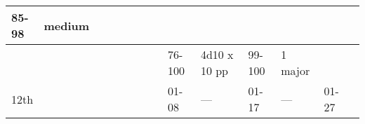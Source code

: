 \begin{longtable}{llllllllllllll}
{\begin{minipage}[t]{0.626in}
85-98\end{minipage}} & \multicolumn{1}{p{0.469in}|}{\begin{minipage}[t]{0.469in}\centering
1 medium\end{minipage}}\\
\hline
\multicolumn{8}{p{1.150in}|}{\begin{minipage}[t]{1.150in}\centering
\end{minipage}} & \multicolumn{1}{|p{0.393in}|}{\begin{minipage}[t]{0.393in}\raggedright
76-100\end{minipage}} & \multicolumn{1}{p{0.469in}|}{\begin{minipage}[t]{0.469in}\raggedright
4d10 x 10 pp\end{minipage}} & \multicolumn{1}{p{0.923in}|}{\begin{minipage}[t]{0.923in}\raggedright
99-100\end{minipage}} & \multicolumn{1}{p{0.469in}|}{\begin{minipage}[t]{0.469in}\raggedright
1 major\end{minipage}} & \multicolumn{1}{p{0.626in}|}{\begin{minipage}[t]{0.626in}\raggedright
\end{minipage}} & \multicolumn{1}{p{0.469in}|}{\begin{minipage}[t]{0.469in}\centering
\end{minipage}}\\
\hline
\multicolumn{8}{p{1.150in}|}{\begin{minipage}[t]{1.150in}\centering
12th\end{minipage}} & \multicolumn{1}{|p{0.393in}|}{\begin{minipage}[t]{0.393in}\raggedright
01-08\end{minipage}} & \multicolumn{1}{p{0.469in}|}{\begin{minipage}[t]{0.469in}\raggedright
---\end{minipage}} & \multicolumn{1}{p{0.923in}|}{\begin{minipage}[t]{0.923in}\raggedright
01-17\end{minipage}} & \multicolumn{1}{p{0.469in}|}{\begin{minipage}[t]{0.469in}\raggedright
---\end{minipage}} & \multicolumn{1}{p{0.626in}|}{\begin{minipage}[t]{0.626in}\raggedright
01-27\end{minipage}} & \multicolumn{1}{p{0.469in}|}{\begin{minipage}[t]{0.469in}\centering

\end{minipage}}
\end{longtable}
